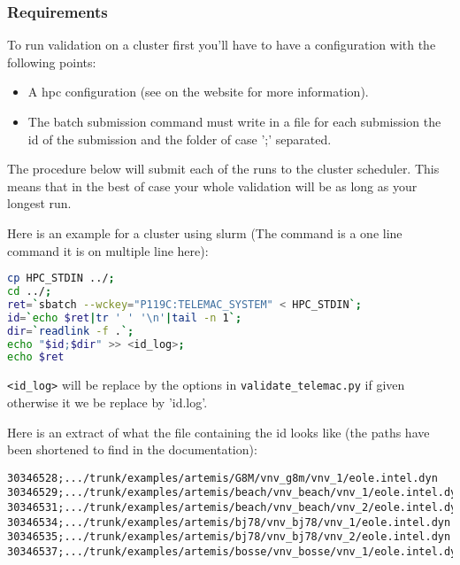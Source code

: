 \subsubsection{Requirements}

To run validation on a cluster first you'll have to have a configuration with
the following points:
\begin{itemize}
  \item A hpc configuration (see on the website for more information).
  \item The batch submission command must write in a file for each submission
    the id of the submission and the folder of case ';' separated.
\end{itemize}

The procedure below will submit each of the \telma{} runs to the cluster
scheduler. This means that in the best of case your whole validation will be as
long as your longest \telma{} run.

Here is an example for a cluster using slurm (The command is a one line command
it is on multiple line here):
\begin{lstlisting}[language=bash]
cp HPC_STDIN ../;
cd ../;
ret=`sbatch --wckey="P119C:TELEMAC_SYSTEM" < HPC_STDIN`;
id=`echo $ret|tr ' ' '\n'|tail -n 1`;
dir=`readlink -f .`;
echo "$id;$dir" >> <id_log>;
echo $ret
\end{lstlisting}

\verb!<id_log>! will be replace by the options in \verb!validate_telemac.py! if
given otherwise it we be replace by 'id.log'.

Here is an extract of what the file containing the id looks like (the paths
have been shortened to find in the documentation):
\begin{verbatim}
30346528;.../trunk/examples/artemis/G8M/vnv_g8m/vnv_1/eole.intel.dyn
30346529;.../trunk/examples/artemis/beach/vnv_beach/vnv_1/eole.intel.dyn
30346531;.../trunk/examples/artemis/beach/vnv_beach/vnv_2/eole.intel.dyn
30346534;.../trunk/examples/artemis/bj78/vnv_bj78/vnv_1/eole.intel.dyn
30346535;.../trunk/examples/artemis/bj78/vnv_bj78/vnv_2/eole.intel.dyn
30346537;.../trunk/examples/artemis/bosse/vnv_bosse/vnv_1/eole.intel.dyn
\end{verbatim}

